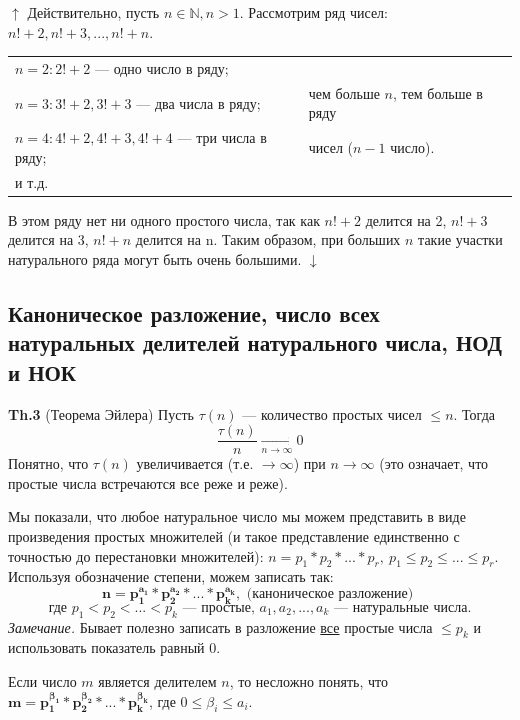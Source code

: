 \documentclass{article}
\begin{document}
            \( \uparrow \) Действительно, пусть \( n \in \mathbb{N}, n > 1 \). Рассмотрим ряд чисел: \( n! + 2,n! + 3,...,n! + n \).

            \begin{tabular}{ll}
              \( n = 2: 2! + 2 \) --- одно число в ряду; &\\
              \( n = 3: 3! + 2, 3! + 3 \) --- два числа в ряду; & чем больше \( n \), тем больше в ряду\\
              \( n = 4: 4! + 2, 4! + 3, 4! + 4 \) --- три числа в ряду; & чисел (\( n - 1 \) число).\\
              и т.д. &\\
            \end{tabular}

            В этом ряду нет ни одного простого числа, так как \( n! + 2 \) делится на 2, \( n! + 3 \) делится на 3, \( n! + n \) делится на n. Таким образом, при больших \( n \) такие участки натурального ряда могут быть очень большими. \( \downarrow \) 
            
        \subsection{Каноническое разложение, число всех натуральных делителей натурального числа, НОД и НОК}
            \textbf{Th.3} (Теорема Эйлера) Пусть \( \tau(n) \) --- количество простых чисел \( \leq n \). Тогда \[ \frac{\tau(n)}{n} \xrightarrow[n \rightarrow \infty]{} 0 \]
            Понятно, что \( \tau(n) \) увеличивается (т.е. \( \rightarrow \infty \)) при \( n \rightarrow \infty \) (это означает, что простые числа встречаются все реже и реже).

            Мы показали, что любое натуральное число мы можем представить в виде произведения простых множителей (и такое представление единственно с точностью до перестановки множителей): \( n = p_1*p_2*...*p_r,\ p_1 \leq p_2 \leq ... \leq p_r \). Используя обозначение степени, можем записать так: \[ \mathbf{n = p_1^{a_1}*p_2^{a_2}*...*p_k^{a_k}}, \textrm{ (каноническое разложение) } \] 
            \[ \textrm{где } p_1 < p_2 < ... < p_k \textrm{ --- простые, } a_1, a_2, ..., a_k \textrm{ --- натуральные числа.} \]
            \textit{Замечание.} Бывает полезно записать в разложение \underline{все} простые числа \( \leq p_k \) и использовать показатель равный 0.

            Если число \( m \) является делителем \( n \), то несложно понять, что \( \mathbf{m = p_1^{\beta_1}*p_2^{\beta_2}*...*p_k^{\beta_k}} \), где \( 0 \leq \beta_i \leq a_i \).
\end{document}
